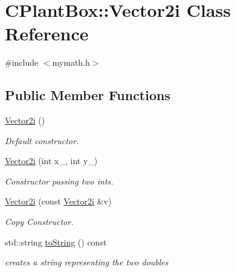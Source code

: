 \hypertarget{classCPlantBox_1_1Vector2i}{}\section{C\+Plant\+Box\+:\+:Vector2i Class Reference}
\label{classCPlantBox_1_1Vector2i}


{\ttfamily \#include $<$mymath.\+h$>$}

\subsection*{Public Member Functions}
\begin{DoxyCompactItemize}
\item 
\mbox{\label{classCPlantBox_1_1Vector2i_a4d3548a9fb282503d7545d77ef319069}} 
\hyperlink{classCPlantBox_1_1Vector2i_a4d3548a9fb282503d7545d77ef319069}{Vector2i} ()
\begin{DoxyCompactList}\small\item\em Default constructor. \end{DoxyCompactList}\item 
\mbox{\label{classCPlantBox_1_1Vector2i_afaeffdd0c598dea93d1542ba90b0a1b3}} 
\hyperlink{classCPlantBox_1_1Vector2i_afaeffdd0c598dea93d1542ba90b0a1b3}{Vector2i} (int x\+\_\+, int y\+\_\+)
\begin{DoxyCompactList}\small\item\em Constructor passing two ints. \end{DoxyCompactList}\item 
\mbox{\label{classCPlantBox_1_1Vector2i_a5a778b2309835119db06a5ac206e6c6e}} 
\hyperlink{classCPlantBox_1_1Vector2i_a5a778b2309835119db06a5ac206e6c6e}{Vector2i} (const \hyperlink{classCPlantBox_1_1Vector2i}{Vector2i} \&v)
\begin{DoxyCompactList}\small\item\em Copy Constructor. \end{DoxyCompactList}\item 
\mbox{\label{classCPlantBox_1_1Vector2i_af13ea3b2b425de04c4db762bee4fea27}} 
std\+::string \hyperlink{classCPlantBox_1_1Vector2i_af13ea3b2b425de04c4db762bee4fea27}{to\+String} () const
\begin{DoxyCompactList}\small\item\em creates a string representing the two doubles \end{DoxyCompactList}\end{DoxyCompactItemize}
